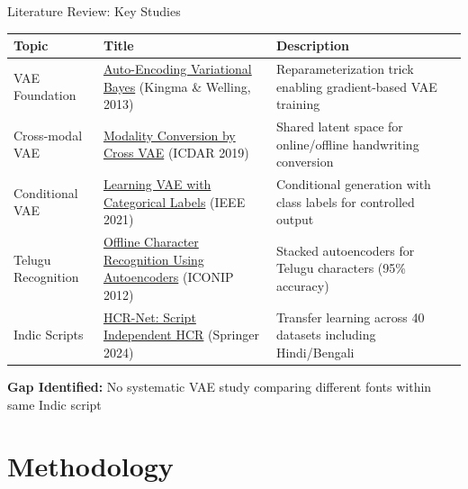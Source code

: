 \documentclass[aspectratio=169, 12pt]{beamer}
\begin{document}
\begin{frame}{Literature Review: Key Studies}
    \tiny
    \begin{table}
    \renewcommand{\arraystretch}{1.15}
    \begin{tabular}{p{} p{} p{}}
        \toprule
        \textbf{Topic} & \textbf{Title} & \textbf{Description} \\
        \midrule
        VAE Foundation & \href{https://arxiv.org/abs/1312.6114}{Auto-Encoding Variational Bayes} (Kingma \& Welling, 2013) & Reparameterization trick enabling gradient-based VAE training \\
        Cross-modal VAE & \href{https://arxiv.org/abs/1906.06142}{Modality Conversion by Cross VAE} (ICDAR 2019) & Shared latent space for online/offline handwriting conversion \\
        Conditional VAE & \href{https://ieeexplore.ieee.org/document/9511404}{Learning VAE with Categorical Labels} (IEEE 2021) & Conditional generation with class labels for controlled output \\
        Telugu Recognition & \href{https://link.springer.com/chapter/10.1007/978-3-642-34478-7_12}{Offline Character Recognition Using Autoencoders} (ICONIP 2012) & Stacked autoencoders for Telugu characters (95\% accuracy) \\
        Indic Scripts & \href{https://link.springer.com/article/10.1007/s11042-024-18655-5}{HCR-Net: Script Independent HCR} (Springer 2024) & Transfer learning across 40 datasets including Hindi/Bengali \\
        \bottomrule
    \end{tabular}
    \end{table}
    
    \vspace{0.2cm}
    \begin{keypoint}
    \textbf{Gap Identified:} No systematic VAE study comparing different fonts within same Indic script
    \end{keypoint}
\end{frame}

\section{Methodology}
\end{document}
